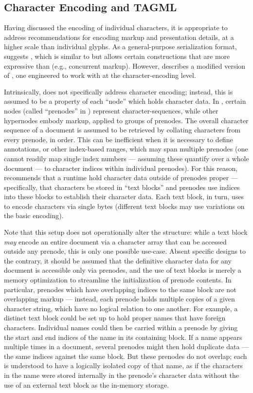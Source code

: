 \documentclass[12pt,letterpaper]{article}
\newcommand{\HTXN}{\resizebox{!}{7.5pt}{\ATexttclr{HTXN}}}
\newcommand{\HGDM}{\resizebox{!}{7.5pt}{\ATexttclr{HGDM}}}
\newcommand{\TAGML}{\resizebox{!}{8pt}{\AcronymText{TAGML}}}
\newcommand{\ATexttclr}[1]{\textcolor{tcolor}{\textbf{#1}}}
\newcommand{\XML}{\resizebox{!}{8pt}{\AcronymText{XML}}}
\newcommand{\textscc}[1]{{\color{orr!35!black}{{%
{\textsc{\textbf{#1}}}}}}}
\newcommand{\AcronymText}[1]{{\textscc{#1}}}
\newcommand{\p}[1]{

\vspace{.7em}#1}
\newcommand{\q}[1]{{\fontfamily{qcr}\selectfont ``}#1{\fontfamily{qcr}\selectfont ''}}
\begin{document}
{\subsection{Character Encoding and TAGML}
\p{Having discussed the encoding of individual 
characters, it is appropriate to address \HGDM{} recommendations 
for encoding markup and presentation details, 
at a higher scale than individual glyphs.  As a general-purpose 
serialization format, \HGDM{} suggests 
\TAGML{}, which is similar to \XML{} but allows 
certain constructions that are more 
expressive than \XML{} (e.g., concurrent markup).
However, \HGDM{} describes a modified version of 
\TAGML{}, one engineered to work with \HTXN{} at the 
character-encoding level.}

\p{Intrinsically, \TAGML{} does not specifically 
address character encoding; instead, this is assumed 
to be a property of each \q{node} which holds 
character data.  In \TAGML{}, certain nodes 
(called \q{prenodes} in \HGDM{}) represent 
character-sequences, while other hypernodes 
embody markup, applied to groups of prenodes.  
The overall character sequence of a document 
is assumed to be retrieved by 
collating characters from every prenode, in order.  
This can be inefficient when it is necessary 
to define annotations, or other index-based 
ranges, which may span multiple prenodes 
(one cannot readily map single index numbers --- assuming 
these quantify over a whole document --- 
to character indices within individual prenodes).  
For this reason, \HGDM{} recommends that 
a \TAGML{} runtime hold character data 
outside of prenodes proper --- specifically, 
that characters be stored in \q{text blocks} 
and prenodes use indices into these blocks 
to establish their character data.  Each 
text block, in turn, uses \HTXN{} to 
encode characters via single bytes 
(different text blocks may use variations 
on the basic \HTXN{} encoding).}

\p{Note that this setup does not operationally 
alter the \TAGML{} structure: while a text block 
\textit{may} encode an entire document via a character 
array that can be accessed outside any prenode, 
this is only one possible use-case.  Absent specific 
designs to the contrary, it should be assumed that the 
definitive character data for any document is 
accessible only via prenodes, and the use of text blocks 
is merely a memory optimization to streamline the initialization 
of prenode contents.  In particular, prenodes which 
have overlapping indices to the same block are not overlapping 
markup --- instead, each prenode holds multiple copies of a 
given character string, which have no logical relation to 
one another.  For example, a distinct text block could be 
set up to hold proper names that have foreign characters.  
Individual names could then be carried within a prenode by 
giving the start and end indices of the name in its 
containing block.  If a name appears multiple times in 
a document, several prenodes might then hold duplicate 
data --- the same indices against the same block.  But 
these prenodes do not overlap; each is understood to 
have a logically isolated copy of that name, as if 
the characters in the name were stored internally in
the prenode's character data without the use of an 
external text block as the in-memory storage.}

}
\end{document}
